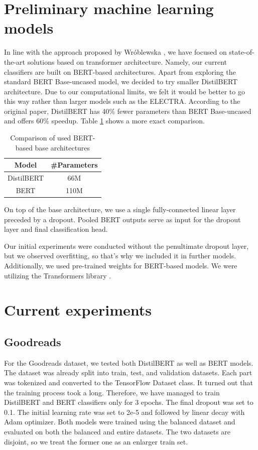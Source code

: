 \documentclass[11pt]{article}
\begin{document}
\section{Preliminary machine learning models}
In line with the approach proposed by Wróblewska , we have focused on state-of-the-art solutions based on transformer architecture. Namely, our current classifiers are built on BERT-based architectures. Apart from exploring the standard BERT Base-uncased model, we decided to try smaller DistilBERT architecture. Due to our computational limits, we felt it would be better to go this way rather than larger models such as the ELECTRA. According to the original paper, DistilBERT has 40\% fewer parameters than BERT Base-uncased and offers 60\% speedup. Table \ref{tab:bert-comparison} shows a more exact comparison.

\begin{table}[h]
    \centering
    \begin{tabular}{|c|c|}
        Model & \#Parameters \\\hline
        DistilBERT & 66M \\
        BERT & 110M
    \end{tabular}
    \caption{Comparison of used BERT-based base architectures}
    \label{tab:bert-comparison}
\end{table}



On top of the base architecture, we use a single fully-connected linear layer preceded by a dropout. Pooled BERT outputs serve as input for the dropout layer and final classification head.

Our initial experiments were conducted without the penultimate dropout layer, but we observed overfitting, so that's why we included it in further models. Additionally, we used pre-trained weights for BERT-based models. We were utilizing the Transformers library \cite{wolf-etal-2020-transformers}.

\section{Current experiments}

\subsection{Goodreads}

For the Goodreads dataset, we tested both DistilBERT as well as BERT models. 
The dataset was already split into train, test, and validation datasets. Each part was tokenized and converted to the TensorFlow Dataset class. It turned out that the training process took a long. Therefore, we have managed to train DistilBERT and BERT classifiers only for 3 epochs. The final dropout was set to 0.1. The initial learning rate was set to 2e-5 and followed by linear decay with Adam optimizer. Both models were trained using the balanced dataset and evaluated on both the balanced and entire datasets. The two datasets are disjoint, so we treat the former one as an enlarger train set.
\end{document}
